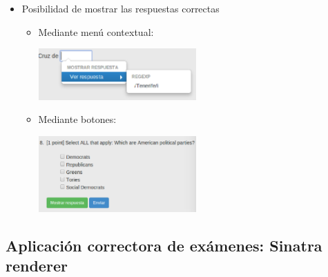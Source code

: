 \documentclass{beamer}
\begin{document}
\begin{frame}[allowframebreaks]
\begin{itemize}
    \item Posibilidad de mostrar las respuestas correctas
    \bigskip
    \begin{itemize}
      \item Mediante menú contextual:
      \begin{center}
        \includegraphics[width=0.5\textwidth]{img/show_answer.eps}
      \end{center}
      \item Mediante botones:
      \begin{center}
        \includegraphics[width=0.5\textwidth]{img/sm.eps}
      \end{center}  
    \end{itemize}
    
  \end{itemize}
\end{frame}
  
\subsection{Aplicación correctora de exámenes: Sinatra renderer}
\end{document}
